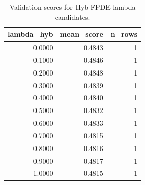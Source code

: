 \begin{table}[t]
\caption{Validation scores for Hyb-FPDE lambda candidates.}
\label{tab:lambda_distribution_computed}
\centering
\begin{tabular}{rrr}
\toprule
lambda\_hyb & mean\_score & n\_rows \\
\midrule
0.0000 & 0.4843 & 1 \\
0.1000 & 0.4846 & 1 \\
0.2000 & 0.4848 & 1 \\
0.3000 & 0.4839 & 1 \\
0.4000 & 0.4840 & 1 \\
0.5000 & 0.4832 & 1 \\
0.6000 & 0.4833 & 1 \\
0.7000 & 0.4815 & 1 \\
0.8000 & 0.4816 & 1 \\
0.9000 & 0.4817 & 1 \\
1.0000 & 0.4815 & 1 \\
\bottomrule
\end{tabular}

\end{table}
